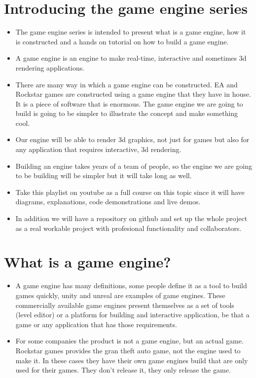 \section{Introducing the game engine series}
\begin{itemize}
    \item The game engine series is intended to present what is a game engine, how it is constructed and a hands on tutorial on how to build a game engine.
    \item A game engine is an engine to make real-time, interactive and sometimes 3d rendering applications.
    \item There are many way in which a game engine can be constructed. EA and Rockstar games are constructed using a game engine that they have in house. It is a piece of software that is enormous. The game engine we are going to build is going to be simpler to illustrate the concept and make something cool.
    \item Our engine will be able to render 3d graphics, not just for games but also for any application that requires interactive, 3d rendering.
    \item Building an engine takes years of a team of people, so the engine we are going to be building will be simpler but it will take long as well.
    \item Take this playlist on youtube as a full course on this topic since it will have diagrams, explanations, code demonstrations and live demos.
    \item In addition we will have a repository on github and set up the whole project as a real workable project with profesional functionality and collaborators.
\end{itemize}

\section{What is a game engine?}
\begin{itemize}
    \item A game engine has many definitions, some people define it as a tool to build games quickly, unity and unreal are examples of game engines. These commercially available game engines present themselves as a set of tools (level editor) or a platform for building and interactive application, be that a game or any application that has those requirements.
    \item For some companies the product is not a game engine, but an actual game. Rockstar games provides the gran theft auto game, not the engine used to make it. In these cases they have their own game engines build that are only used for their games. They don't release it, they only release the game.
\end{itemize}

